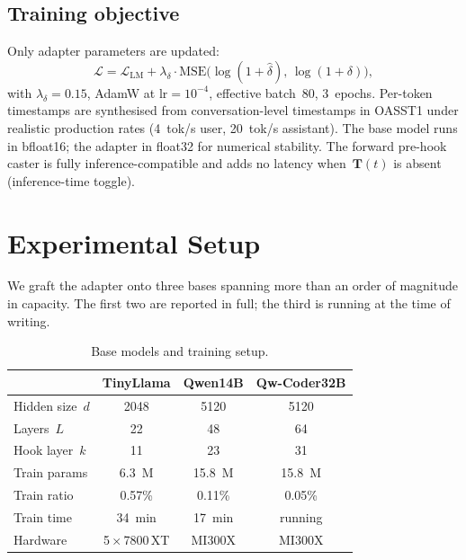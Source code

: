 \documentclass[10pt,twocolumn,letterpaper]{article}
\begin{document}
\subsection{Training objective}

Only adapter parameters are updated:
\begin{equation}
\mathcal{L} = \mathcal{L}_{\text{LM}} + \lambda_\delta \cdot \text{MSE}\bigl(\log(1\!+\!\hat{\delta}),\,\log(1\!+\!\delta)\bigr),
\end{equation}
with $\lambda_\delta = 0.15$, AdamW at $\text{lr}=10^{-4}$, effective batch~80, 3~epochs. Per-token timestamps are synthesised from conversation-level timestamps in OASST1 under realistic production rates (4~tok/s user, 20~tok/s assistant). The base model runs in bfloat16; the adapter in float32 for numerical stability. The forward pre-hook caster is fully inference-compatible and adds no latency when~$\mathbf{T}(t)$ is absent (inference-time toggle).

\section{Experimental Setup}

We graft the adapter onto three bases spanning more than an order of magnitude in capacity. The first two are reported in full; the third is running at the time of writing.

\begin{table}[H]
\centering
\small
\caption{Base models and training setup.}
\label{tab:setup}
\begin{tabular}{@{}lccc@{}}
\toprule
 & \textbf{TinyLlama} & \textbf{Qwen14B} & \textbf{Qw-Coder32B} \\
\midrule
Hidden size~$d$   & 2048        & 5120         & 5120 \\
Layers~$L$        & 22          & 48           & 64 \\
Hook layer~$k$    & 11          & 23           & 31 \\
Train params      & 6.3~M       & 15.8~M       & 15.8~M \\
Train ratio       & 0.57\%      & 0.11\%       & 0.05\% \\
Train time        & 34~min      & 17~min       & running \\
Hardware          & 5\,$\times$\,7800\,XT & MI300X & MI300X \\
\bottomrule
\end{tabular}
\end{table}
\end{document}
